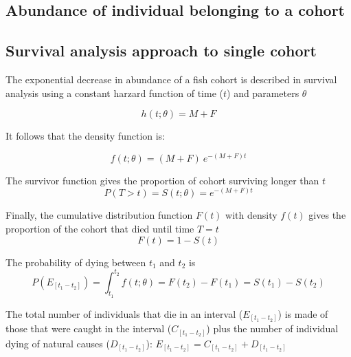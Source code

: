 

\subsection{Abundance of individual belonging to a cohort} 

\subsection{Survival analysis approach to single cohort}

The exponential decrease in abundance of a fish cohort is described in survival analysis \citep{cox84b} using a constant harzard function of time ($t$) and parameters $\theta$

\begin{equation}
h(t; \theta) = M + F
\end{equation}

It follows that the density function is:

\begin{equation}
f(t; \theta) = (M + F) \ e^{-(M+F)t}
\end{equation}

The survivor function gives the proportion of cohort surviving longer than $t$ \citep{kleinbaum2005survival}
\begin{equation}
P(T>t) = S(t; \theta) = e^{-(M+F)t}
\end{equation}

Finally, the cumulative distribution function $F(t)$ with density $f(t)$ gives the proportion of the cohort that died until time $T=t$
\begin{equation}
F(t) = 1 - S(t)
\end{equation}

The probability of dying between $t_{1}$ and $t_{2}$ is
\begin{equation}
P(E_{[t_{1}-t_{2}]}) = \int_{t_{1}}^{t_{2}} f(t; \theta) = F(t_{2}) - F(t_{1}) = S(t_{1}) - S(t_{2})
\end{equation}

The total number of individuals that die in an interval ($E_{[t_{1}-t_{2}]}$) is made of those that were caught in the interval ($C_{[t_{1}-t_{2}]}$) plus the number of individual dying of natural causes ($D_{[t_{1}-t_{2}]}$):  $E_{[t_{1}-t_{2}]} = C_{[t_{1}-t_{2}]} + D_{[t_{1}-t_{2}]}$

